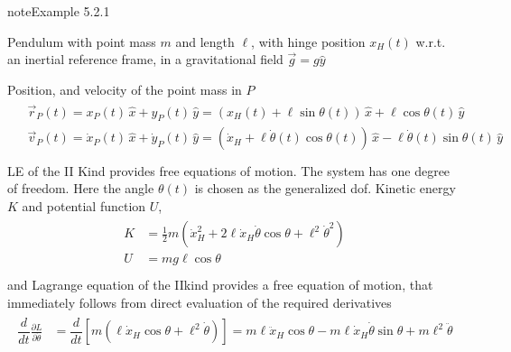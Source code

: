 \documentclass[letterpaper,10pt,english]{jupyterBook}
\begin{document}
\begin{sphinxadmonition}{note}{Example 5.2.1}



\sphinxAtStartPar
Pendulum with point mass \(m\) and length \(\ell\), with hinge position \(x_H(t)\) w.r.t. an inertial reference frame, in a gravitational field \(\vec{g} = g \hat{y}\)

\sphinxAtStartPar
Position, and velocity of the point mass in \(P\)
\begin{equation*}
\begin{split}\begin{aligned}
  & \vec{r}_P(t) = x_P(t) \, \hat{x} + y_P(t) \, \hat{y} = \left( x_H(t) + \ell \sin \theta(t) \right) \, \hat{x} + \ell \cos \theta(t) \, \hat{y} \\
  & \vec{v}_P(t) = \dot{x}_P(t) \, \hat{x} + \dot{y}_P(t) \, \hat{y} = (\dot{x}_H + \ell \dot{\theta}(t) \cos \theta(t)) \, \hat{x} - \ell \dot{\theta}(t) \sin \theta(t) \, \hat{y} \\
\end{aligned}\end{split}
\end{equation*}
\sphinxAtStartPar
{} LE of the II Kind provides free equations of motion. The system has one degree of freedom. Here the angle \(\theta(t)\) is chosen as the generalized dof. Kinetic energy \(K\) and potential function \(U\),
\begin{equation*}
\begin{split}\begin{aligned}
  K & = \frac{1}{2} m \left( \dot{x}_H^2 + 2 \ell \dot{x}_H \dot \theta \cos \theta + \ell^2 \dot{\theta}^2  \right) \\
  U & = m g \ell \cos \theta \\
\end{aligned}\end{split}
\end{equation*}
\sphinxAtStartPar
and Lagrange equation of the II\sphinxhyphen{}kind provides a free equation of motion, that immediately follows from direct evaluation of the required derivatives
\begin{equation*}
\begin{split}\begin{aligned}
  \dfrac{d}{dt}\frac{\partial L}{\partial \dot{\theta}}
  & = \dfrac{d}{dt} \left[ m (\ell \dot{x}_H \cos \theta + \ell^2 \dot{\theta} ) \right]
    = m \ell \ddot{x}_H \cos \theta - m \ell \dot{x}_H \dot{\theta} \sin \theta + m \ell^2 \ddot{\theta} \\

\end{aligned}
\end{split}
\end{equation*}
\end{sphinxadmonition}
\end{document}
